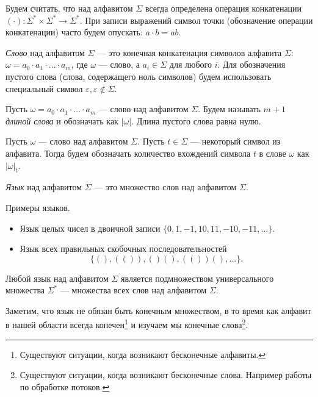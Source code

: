 Будем считать, что над алфавитом $\Sigma$ всегда определена операция конкатенации $(\cdot): \Sigma^* \times \Sigma^* \to \Sigma^*$.
При записи выражений символ точки (обозначение операции конкатенации) часто будем опускать: $a \cdot b = ab$.

\begin{definition}
\textit{Слово} над алфавитом $\Sigma$ --- это конечная конкатенация символов алфавита $\Sigma$: $\omega = a_0 \cdot a_1 \cdot \ldots \cdot a_m$, где $\omega$ --- слово, а $a_i \in \Sigma$ для любого $i$.
Для обозначения пустого слова (слова, содержащего ноль символов) будем использовать специальный символ $\varepsilon, \varepsilon \notin \Sigma$.
\end{definition}

\begin{definition}
Пусть $\omega = a_0 \cdot a_1 \cdot \ldots \cdot a_m$ --- слово над алфавитом $\Sigma$.
Будем называть $m + 1$ \textit{длиной слова} и обозначать как $|\omega|$. Длина пустого слова равна нулю.
\end{definition}

\begin{definition}
  Пусть $\omega$ --- слово над алфавитом $\Sigma$. Пусть $t \in \Sigma$ --- некоторый символ из алфавита.
  Тогда будем обозначать количество вхождений символа $t$ в слове $\omega$ как $|\omega|_t$.
  \end{definition}
  
\begin{definition}
\textit{Язык} над алфавитом $\Sigma$ --- это множество слов над алфавитом $\Sigma$.
\end{definition}

\begin{example}

Примеры языков.

  \begin{itemize}
    \item Язык целых чисел в двоичной записи $\{0, 1, -1, 10, 11, -10, -11, \dots\}.$
    \item Язык всех правильных скобочных последовательностей $$\{(), (()), ()(), (())(), \dots\}.$$
  \end{itemize}
\end{example}

Любой язык над алфавитом $\Sigma$ является подмножеством универсального множества $\Sigma^*$ --- множества всех слов над алфавитом $\Sigma$.

Заметим, что язык не обязан быть конечным множеством, в то время как алфавит в нашей области всегда конечен\footnote{Существуют ситуации, когда возникают бесконечные алфавиты.} и изучаем мы конечные слова\footnote{Существуют ситуации, когда возникают бесконечные слова. Например работы по обработке потоков.}.

